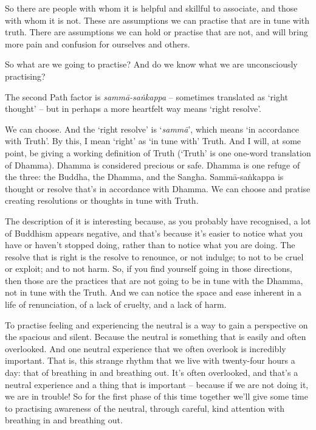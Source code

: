 So there are people with whom it is helpful and skillful to associate, and those
with whom it is not. These are assumptions we can practise that are in tune with
truth. There are assumptions we can hold or practise that are not, and will
bring more pain and confusion for ourselves and others.

So what are we going to practise? And do we know what we are unconsciously
practising?

The second Path factor is \emph{sammā-saṅkappa} -- sometimes translated as `right
thought' -- but in perhaps a more heartfelt way means `right resolve'.

We can choose. And the `right resolve' is `\emph{sammā}', which means `in
accordance with Truth'. By this, I mean `right' as `in tune with' Truth. And I
will, at some point, be giving a working definition of Truth (`Truth' is one
one-word translation of Dhamma). Dhamma is considered precious or
safe. Dhamma is one refuge of the three: the Buddha, the Dhamma,
and the Sangha. Sammā-saṅkappa is thought or resolve that's in accordance with
Dhamma. We can choose and pratise creating resolutions or thoughts in tune with Truth.

The description of it is interesting because, as you probably have recognised, a
lot of Buddhism appears negative, and that's because it's easier to notice what
you have or haven't stopped doing, rather than to notice what you are doing. The
resolve that is right is the resolve to renounce, or not indulge; to not to be
cruel or exploit; and to not harm. So, if you find yourself going in those
directions, then those are the practices that are not going to be in tune with
the Dhamma, not in tune with the Truth. And we can notice the space and ease
inherent in a life of renunciation, of a lack of cruelty, and a lack of harm.

To practise feeling and experiencing the neutral is a way to gain a perspective on the spacious and silent. Because the neutral is
something that is easily and often overlooked. And one neutral experience that
we often overlook is incredibly important. That is, this strange rhythm that we
live with twenty-four hours a day: that of breathing in and breathing out. It's
often overlooked, and that's a neutral experience and a thing that is important --
because if we are not doing it, we are in trouble! So for the first phase of
this time together we'll give some time to practising awareness of the neutral,
through careful, kind attention with breathing in and breathing out.

